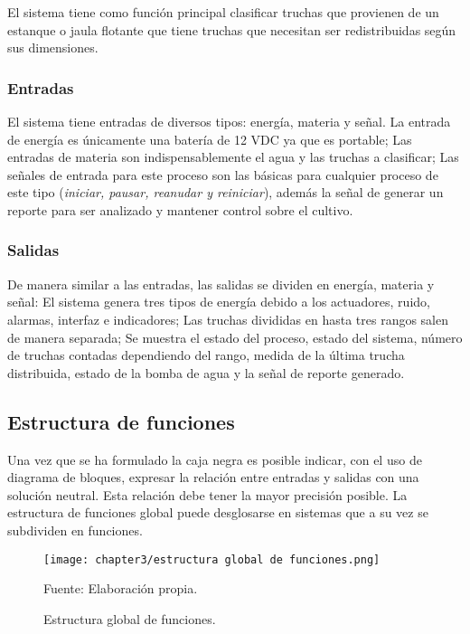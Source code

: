 El sistema tiene como función principal clasificar truchas que provienen de un estanque o jaula flotante que tiene truchas que necesitan ser redistribuidas según sus dimensiones.

\subsubsection{Entradas}

El sistema tiene entradas de diversos tipos: energía, materia y señal. La entrada de energía es únicamente una batería de 12 VDC ya que es portable; Las entradas de materia son indispensablemente el agua y las truchas a clasificar; Las señales de entrada para este proceso son las básicas para cualquier proceso de este tipo (\textit{iniciar, pausar, reanudar y reiniciar}), además la señal de generar un reporte para ser analizado y mantener control sobre el cultivo.

\subsubsection{Salidas}

De manera similar a las entradas, las salidas se dividen en energía, materia y señal: El sistema genera tres tipos de energía debido a los actuadores, ruido, alarmas, interfaz e indicadores; Las truchas divididas en hasta tres rangos salen de manera separada; Se muestra el estado del proceso, estado del sistema, número de truchas contadas dependiendo del rango, medida de la última trucha distribuida, estado de la bomba de agua y la señal de reporte generado.

\subsection{Estructura de funciones}

Una vez que se ha formulado la caja negra es posible indicar, con el uso de diagrama de bloques, expresar la relación entre entradas y salidas con una solución neutral. Esta relación debe tener la mayor precisión posible. La estructura de funciones global puede desglosarse en sistemas que a su vez se subdividen en funciones.\cite[p.~169-181]{Pahl2007}

\newpage
\thispagestyle{mylandscape}
\begin{landscape}
	\begin{figure}[H]
		\centering
		\texttt{[image: chapter3/estructura global de funciones.png]}
		\caption{Estructura global de funciones.}
		\begin{myflushleftportland}			
			Fuente: Elaboración propia.
		\end{myflushleftportland}
		\label{fig:estructura global de funciones}
	\end{figure}
\end{landscape}


